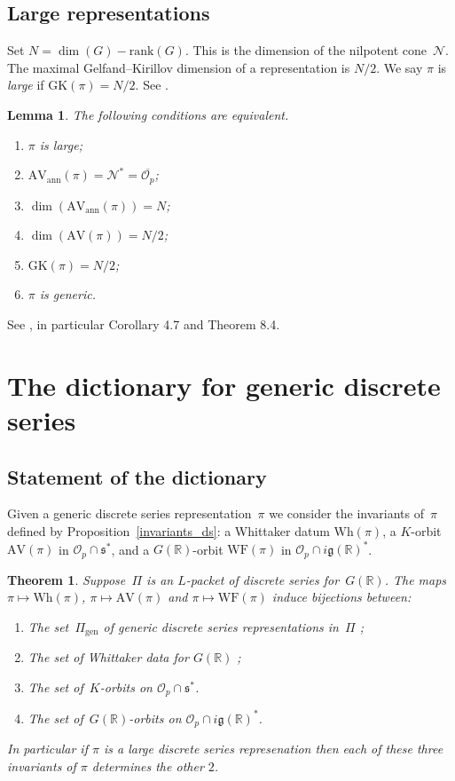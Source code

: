 \documentclass[10pt,leqno]{article}
\newtheorem{theorem}[equation]{Theorem}
\newtheorem{lemma}[equation]{Lemma}
\renewcommand{\O}{\mathcal O}
\newcommand{\R}{\mathbb R}
\newcommand{\N}{\mathcal N}
\newcommand{\g}{\mathfrak g}
\newcommand{\s}{\mathfrak s}
\newcommand{\AV}{\mathrm{AV}}
\newcommand{\Wh}{\mathrm{Wh}}
\newcommand{\WF}{\mathrm{WF}}
\newcommand{\AVann}{\mathrm{AV}_{\mathrm{ann}}}
\newcommand{\GK}{\mathrm{GK}}
\newcommand{\Op}{\O_p}
\begin{document}
\subsection{Large representations} Set $N=\dim(G)-\mathrm{rank}(G)$. This is the dimension of the nilpotent cone~$\N$. The maximal Gelfand--Kirillov dimension of a representation is $N/2$.
We say $\pi$ is {\it large} if $\GK(\pi)=N/2$. See \cite[Section~6]{vogan-gelfand-kirillov}. 


\begin{lemma}
  \label{l:large}
  The following conditions are equivalent.
  \begin{enumerate}
    \item $\pi$ is large;
\item $\AVann(\pi)=\N^*=\overline{\Op}$;
\item $\dim(\AVann(\pi))=N$;
  \item $\dim(\AV(\pi))=N/2$;
  \item $\GK(\pi)=N/2$;
    \item $\pi$ is generic.

\end{enumerate}
\end{lemma}
See \cite{vogan_bowdoin}, in particular Corollary 4.7 and Theorem 8.4.




\section{The dictionary for generic discrete series}


\subsection{Statement of the dictionary}  



Given a generic discrete series representation~$\pi$ we consider the invariants of~$\pi$ defined by Proposition~\ref{invariants_ds}: a Whittaker datum  $\Wh(\pi)$, a $K$-orbit $\AV(\pi)$ in $\mathcal{O}_p \cap \s^*$, and a $G(\R)$-orbit $\WF(\pi)$ in $\mathcal{O}_p \cap  i \g(\R)^*$.


\begin{theorem} \label{th:main} Suppose~$\Pi$ is an $L$-packet of discrete series for~$G(\R)$. 
The maps $\pi \mapsto \Wh(\pi)$, $\pi \mapsto \AV(\pi)$ and $\pi\mapsto \WF(\pi)$ induce bijections between:
\begin{enumerate}
\item[(1)] The set~$\Pi_{\mathrm{gen}}$ of generic discrete series representations in~$\Pi$ ;
\item[(2)] The set of Whittaker data for $G(\R)$ ;
\item[(3)] The set of~$K$-orbits on $\mathcal{O}_p \cap \s^*$.
\item[(4)] The set of~$G(\R)$-orbits on $\mathcal{O}_p \cap  i \g(\R)^*$.
\end{enumerate}
In particular if $\pi$ is a large discrete series represenation then each of these three invariants of $\pi$ determines the other $2$. 
\end{theorem}
\end{document}
